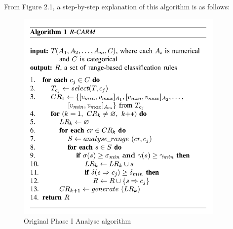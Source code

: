 From Figure 2.1, a step-by-step explanation of this algorithm is as follows: 

\begin{figure}[h]
    \centering
    \includegraphics[width=4in]{figures/DrShaoAlgorithm1}
    \caption[Original Phase I Analyse algorithm]{Original Phase I Analyse algorithm}
    \label{fig:figure2_1}
\end{figure}



